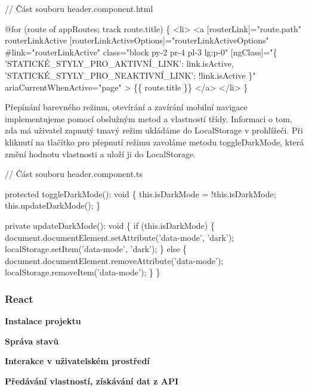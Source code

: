 \begin{prog}
// Část souboru header.component.html

@for (route of appRoutes; track route.title) \{
  <li>
    <a
      [routerLink]="route.path"
      routerLinkActive
      [routerLinkActiveOptions]="routerLinkActiveOptions"
      #link="routerLinkActive"
      class="block py-2 pr-4 pl-3 lg:p-0"
      [ngClass]="\{
        'STATICKÉ_STYLY_PRO_AKTIVNÍ_LINK': link.isActive,
        'STATICKÉ_STYLY_PRO_NEAKTIVNÍ_LINK': !link.isActive
      \}"
      ariaCurrentWhenActive="page"
    >
      \{\{ route.title \}\}
    </a>
  </li>
\}
\end{prog}

Přepínání barevného režimu, otevírání a zavírání mobilní navigace implementujeme pomocí obslužným metod a vlastností třídy. 
Informaci o tom, zda má uživatel zapnutý tmavý režim ukládáme do LocalStorage v prohlížeči. 
Při kliknutí na tlačítko pro přepnutí režimu zavoláme metodu toggleDarkMode, která změní hodnotu vlastnosti a uloží ji do LocalStorage.

\begin{prog}
// Část souboru header.component.ts

protected toggleDarkMode(): void \{
  this.isDarkMode = !this.isDarkMode;
  this.updateDarkMode();
\}

private updateDarkMode(): void \{
  if (this.isDarkMode) \{
    document.documentElement.setAttribute('data-mode', 'dark');
    localStorage.setItem('data-mode', 'dark');
  \} else \{
    document.documentElement.removeAttribute('data-mode');
    localStorage.removeItem('data-mode');
  \}
\}
\end{prog}

\subsubsection{React}

\begin{flushleft}
  \textbf{Instalace projektu}
\end{flushleft}

\begin{flushleft}
  \textbf{Správa stavů}
\end{flushleft}

\begin{flushleft}
  \textbf{Interakce v uživatelském prostředí}
\end{flushleft}

\begin{flushleft}
  \textbf{Předávání vlastností, získávání dat z API}
\end{flushleft}



